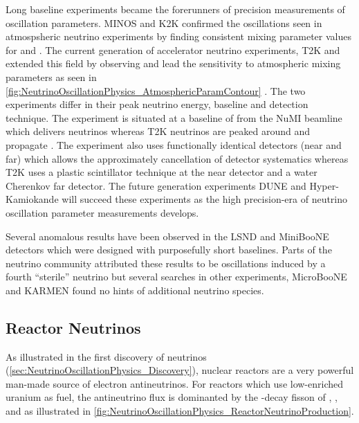 Long baseline experiments became the forerunners of precision measurements of oscillation parameters. MINOS \cite{PhysRevLett.97.191801} and K2K \cite{PhysRevLett.9.36} confirmed the \quickmath{\nu_{\mu} \rightarrow \nu_{\mu}} oscillations seen in atmospsheric neutrino experiments by finding consistent mixing parameter values for \sinsqatm and \delmsqatm. The current generation of accelerator neutrino experiments, T2K and \NOVA extended this field by observing  and lead the sensitivity to atmospheric mixing parameters as seen in \autoref{fig:NeutrinoOscillationPhysics_AtmosphericParamContour} \cite{PhysRevLett.123.151803}. The two experiments differ in their peak neutrino energy, baseline and detection technique. The \NOVA experiment is situated at a baseline of  from the NuMI beamline which delivers  neutrinos whereas T2K neutrinos are peaked around  and propagate . The \NOVA experiment also uses functionally identical detectors (near and far) which allows the approximately cancellation of detector systematics whereas T2K uses a plastic scintillator technique at the near detector and a water Cherenkov far detector. The future generation experiments DUNE \cite{Abi2020-cm} and Hyper-Kamiokande \cite{Hyper-Kamiokande_Proto-Collaboration2015-ac} will succeed these experiments as the high precision-era of neutrino oscillation parameter measurements develops.

Several anomalous results have been observed in the LSND \cite{PhysRevD.64.112007} and MiniBooNE \cite{PhysRevLett.110.161801} detectors which were designed with purposefully short baselines. Parts of the neutrino community attributed these results to be oscillations induced by a fourth ``sterile'' neutrino \cite{Blanco_2020} but several searches in other experiments, MicroBooNE \cite{10.48550/arxiv.2110.14054} and KARMEN \cite{PhysRevD.65.112001} found no hints of additional neutrino species. 

\subsection{Reactor Neutrinos}
\label{subsec:NeutrinoOscillationPhysics_ReactorNeutrinos}

As illustrated in the first discovery of neutrinos (\autoref{sec:NeutrinoOscillationPhysics_Discovery}), nuclear reactors are a very powerful man-made source of electron antineutrinos. For reactors which use low-enriched uranium  as fuel, the antineutrino flux is dominanted by the \quickmath{\beta}-decay fisson of , ,  and  \cite{Kim2013-ye} as illustrated in \autoref{fig:NeutrinoOscillationPhysics_ReactorNeutrinoProduction}.

